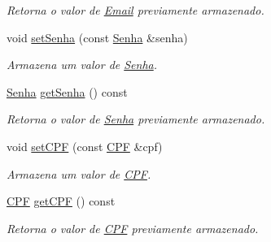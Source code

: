 \begin{DoxyCompactItemize}
\begin{DoxyCompactList}\small\item\em Retorna o valor de \hyperlink{classshibarides_1_1Email}{Email} previamente armazenado. \end{DoxyCompactList}\item 
void \hyperlink{classshibarides_1_1Usuario_a089f1080a88d5170d210c69c77127b06}{set\+Senha} (const \hyperlink{classshibarides_1_1Senha}{Senha} \&senha)
\begin{DoxyCompactList}\small\item\em Armazena um valor de \hyperlink{classshibarides_1_1Senha}{Senha}. \end{DoxyCompactList}\item 
\hyperlink{classshibarides_1_1Senha}{Senha} \hyperlink{classshibarides_1_1Usuario_a17d84322766046fc4457cce62b35daf9}{get\+Senha} () const 
\begin{DoxyCompactList}\small\item\em Retorna o valor de \hyperlink{classshibarides_1_1Senha}{Senha} previamente armazenado. \end{DoxyCompactList}\item 
void \hyperlink{classshibarides_1_1Usuario_ad22e4cf193a09a935b33ee6bc1b5102d}{set\+C\+PF} (const \hyperlink{classshibarides_1_1CPF}{C\+PF} \&cpf)
\begin{DoxyCompactList}\small\item\em Armazena um valor de \hyperlink{classshibarides_1_1CPF}{C\+PF}. \end{DoxyCompactList}\item 
\hyperlink{classshibarides_1_1CPF}{C\+PF} \hyperlink{classshibarides_1_1Usuario_a9710f4d8e7c3ae151ee45f164a147b0c}{get\+C\+PF} () const 
\begin{DoxyCompactList}\small\item\em Retorna o valor de \hyperlink{classshibarides_1_1CPF}{C\+PF} previamente armazenado. \end{DoxyCompactList}\end{DoxyCompactItemize}
